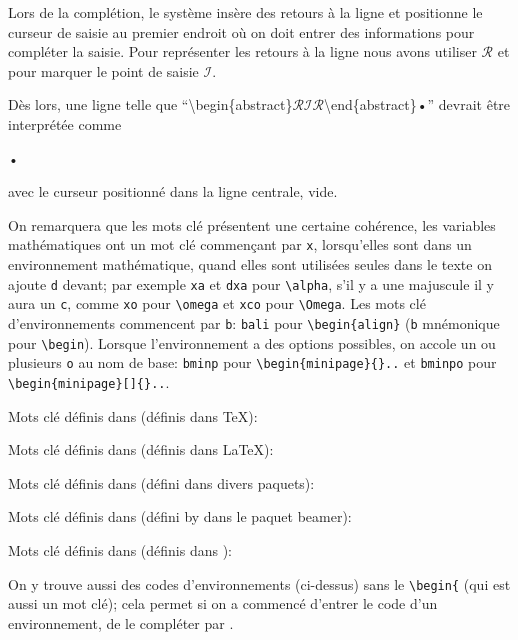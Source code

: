 \newcommand{\AutoCompRet}{$\mathcal{R}$}
\newcommand{\AutoCompIns}{$\mathcal{I}$}
Lors de la complétion, le système insère des retours à la ligne et positionne le curseur de saisie au premier endroit où on doit entrer des informations pour compléter la saisie. Pour représenter les retours à la ligne nous avons utiliser \AutoCompRet{} et pour marquer le point de saisie \AutoCompIns.

Dès lors, une ligne telle que ``\textbackslash begin\{abstract\}{\AutoCompRet}{\AutoCompIns}{\AutoCompRet}\textbackslash end\{abstract\}•'' devrait être interprétée comme
\begin{verbExample}
\begin{abstract}

\end{abstract}•
\end{verbExample}
avec le curseur positionné dans la ligne centrale, vide.

On remarquera que les mots clé présentent une certaine cohérence, les variables mathématiques ont un mot clé commençant par \verb|x|, lorsqu'elles sont dans un environnement mathématique, quand elles sont utilisées seules dans le texte on ajoute \verb|d| devant; par exemple \verb|xa| et \verb|dxa| pour \verb|\alpha|, s'il y a une majuscule il y aura un \verb|c|, comme  \verb|xo| pour
\verb|\omega| et \verb|xco| pour \verb|\Omega|. Les mots clé d'environnements commencent par \verb|b|: \verb|bali| pour
\verb|\begin{align}| (\verb|b| mnémonique pour \verb|\begin|). Lorsque l'environnement a des options possibles, on accole un ou plusieurs \verb|o| au nom de base: \verb|bminp| pour \verb|\begin{minipage}{}..| et 
\verb|bminpo| pour \verb|\begin{minipage}[]{}..|.

%
Mots clé définis dans  (définis dans \TeX):
%


Mots clé définis dans  (définis dans \LaTeX):
%


Mots clé définis dans  (défini dans divers paquets):


Mots clé définis dans  (défini by dans le paquet beamer):


Mots clé définis dans  (définis dans \ConTeXt):


On y trouve aussi des codes d'environnements (ci-dessus) sans le \verb|\begin{| (qui est aussi un mot clé); cela permet si on a commencé d'entrer le code d'un environnement, de le compléter par .
